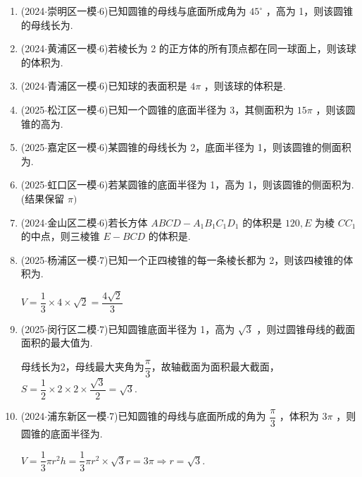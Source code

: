 \begin{enumerate}
    \item (2024$\cdot$崇明区一模$\cdot$6)已知圆锥的母线与底面所成角为 ${45}^{ \circ  }$ ，高为 1，则该圆锥的母线长为.

    \item (2024$\cdot$黄浦区一模$\cdot$6)若棱长为 2 的正方体的所有顶点都在同一球面上，则该球的体积为.

    \item (2024$\cdot$青浦区一模$\cdot$6)已知球的表面积是 ${4\pi }$ ，则该球的体积是.

    \item (2025$\cdot$松江区一模$\cdot$6)已知一个圆锥的底面半径为 3，其侧面积为 ${15\pi }$ ，则该圆锥的高为.

    \item (2025$\cdot$嘉定区一模$\cdot$6)某圆锥的母线长为 2，底面半径为 1，则该圆锥的侧面积为\blkda[2]{${2\pi }$}.

    \item (2025$\cdot$虹口区一模$\cdot$6)若某圆锥的底面半径为 1，高为 1，则该圆锥的侧面积为.(结果保留 $\pi )$

    \item (2024$\cdot$金山区二模$\cdot$6)若长方体 ${ABCD} - {A}_{1}{B}_{1}{C}_{1}{D}_{1}$ 的体积是 ${120},E$ 为棱 $C{C}_{1}$ 的中点，则三棱锥 $E - {BCD}$ 的体积是.

    \item (2025$\cdot$杨浦区一模$\cdot$7)已知一个正四棱锥的每一条棱长都为 2，则该四棱锥的体积为.
    \begin{jieda}
        $V = \dfrac{1}{3} \times 4 \times \sqrt{2} = \dfrac{4\sqrt{2}}{3}$
    \end{jieda}

    \item (2025$\cdot$闵行区二模$\cdot$7)已知圆锥底面半径为 1，高为 $\sqrt{3}$ ，则过圆锥母线的截面面积的最大值为.
    \begin{jieda}
        母线长为$2$，母线最大夹角为$\dfrac{\pi}{3}$，故轴截面为面积最大截面，$S = \dfrac{1}{2} \times 2 \times 2 \times \dfrac{\sqrt{3}}{2} = \sqrt{3}$.
    \end{jieda}

    \item (2024$\cdot$浦东新区一模$\cdot$7)已知圆锥的母线与底面所成的角为 $\dfrac{\pi }{3}$ ，体积为 ${3\pi }$ ，则圆锥的底面半径为.
    \begin{jieda}
        $V = \dfrac{1}{3}\pi {r}^{2}h = \dfrac{1}{3}\pi {r}^{2} \times  \sqrt{3}r = {3\pi } \Longrightarrow  r = \sqrt{3}$.
    \end{jieda}


\end{enumerate}
